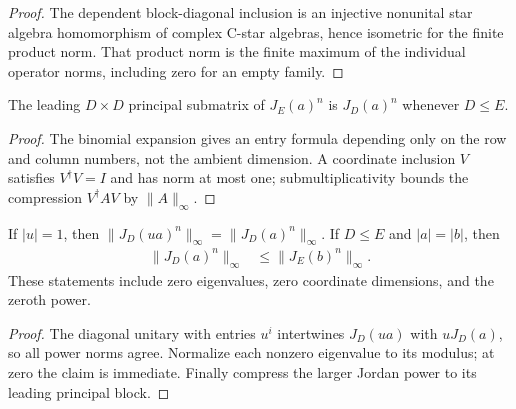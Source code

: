 \begin{proof}
    \leanok
    The dependent block-diagonal inclusion is an injective nonunital star
    algebra homomorphism of complex C-star algebras, hence isometric for
    the finite product norm. That product norm is the finite maximum of
    the individual operator norms, including zero for an empty family.
\end{proof}

\begin{theorem}
    \label{thm:wolf_jordan_principal_power_compression}
    \leanok
    The leading $D\times D$ principal submatrix of $J_E(a)^n$ is
    $J_D(a)^n$ whenever $D\le E$.
\end{theorem}

\begin{proof}
    \leanok
    The binomial expansion gives an entry formula depending only on the
    row and column numbers, not the ambient dimension. A coordinate
    inclusion $V$ satisfies $V^\dagger V=I$ and has norm at most one;
    submultiplicativity bounds the compression $V^\dagger A V$ by $\lVert A\rVert_\infty$.
\end{proof}

\begin{theorem}
    \label{thm:wolf_jordan_phase_dimension_comparison}
    \leanok
    If $|u|=1$, then $\lVert J_D(ua)^n\rVert_\infty=
    \lVert J_D(a)^n\rVert_\infty$. If $D\le E$ and $|a|=|b|$, then
    \begin{align}
      \lVert J_D(a)^n\rVert_\infty
        &\le\lVert J_E(b)^n\rVert_\infty.
    \end{align}
    These statements include zero eigenvalues, zero coordinate dimensions,
    and the zeroth power.
\end{theorem}

\begin{proof}
    \leanok
    The diagonal unitary with entries $u^i$ intertwines $J_D(ua)$ with
    $uJ_D(a)$, so all power norms agree. Normalize each nonzero eigenvalue
    to its modulus; at zero the claim is immediate. Finally compress the
    larger Jordan power to its leading principal block.
\end{proof}

